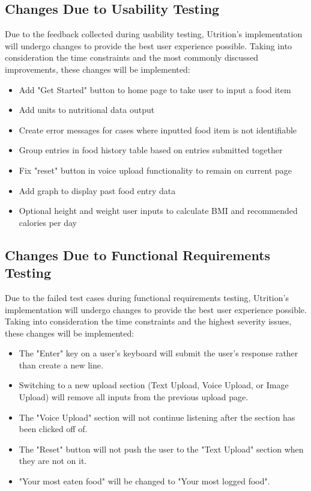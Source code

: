 \documentclass[12pt, titlepage]{article}
\begin{document}
	\subsection{Changes Due to Usability Testing}
	Due to the feedback collected during usability testing, Utrition's implementation will undergo changes to provide the best user experience possible. Taking into consideration the time constraints and the most commonly discussed improvements, these changes will be implemented:
	\begin{itemize}
		\item Add "Get Started" button to home page to take user to input a food item
		\item Add units to nutritional data output
		\item Create error messages for cases where inputted food item is not identifiable 
		\item Group entries in food history table based on entries submitted together
		\item Fix "reset" button in voice upload functionality to remain on current page
		\item Add graph to display past food entry data
		\item Optional height and weight user inputs to calculate BMI and recommended calories per day 
	\end{itemize}

	\subsection{Changes Due to Functional Requirements Testing}
	Due to the failed test cases during functional requirements testing, Utrition's implementation will undergo changes to provide the best user experience possible. Taking into consideration the time constraints and the highest severity issues, these changes will be implemented:
	\begin{itemize}
		\item The "Enter" key on a user's keyboard will submit the user's response rather than create a new line.
		\item Switching to a new upload section (Text Upload, Voice Upload, or Image Upload) will remove all inputs from the previous upload page. 
		\item The "Voice Upload" section will not continue listening after the section has been clicked off of.
		\item The "Reset" button will not push the user to the "Text Upload" section when they are not on it.
		\item "Your most eaten food" will be changed to "Your most logged food".
	\end{itemize}		
\end{document}
